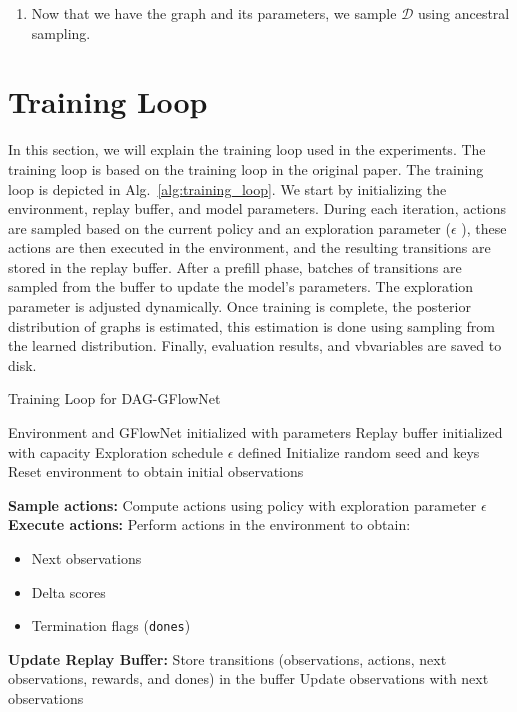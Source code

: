 \documentclass{lxaiproposal}
\begin{document}
\begin{table}[h]
\begin{enumerate}
            \item Now that we have the graph and its parameters, we sample $\mathcal{D}$ using ancestral sampling.
        \end{enumerate}


        \section{Training Loop}\label{app:training_loop}
        \vspace*{-3mm}

        In this section, we will explain the training loop used in the experiments. The training loop is based on the
        training loop in the original paper. The training loop is depicted in Alg.~\ref{alg:training_loop}.
        We start by initializing the environment, replay buffer, and model parameters.
        During each iteration, actions are sampled based on the current policy and an exploration parameter ($\epsilon$
        ), these actions are then executed in the environment, and the resulting transitions are stored in the replay
        buffer. After a prefill
        phase, batches of transitions are sampled from the buffer to update the model's parameters. The exploration
        parameter is adjusted dynamically. Once training is complete, the posterior distribution of graphs is estimated,
        this estimation is done using sampling from the learned distribution. Finally, evaluation results, and
        vbvariables are saved to disk.


        \begin{algorithm}[H]
            \caption{Training Loop for DAG-GFlowNet}
            \begin{algorithmic}[1]
                \Require Environment and GFlowNet initialized with parameters
                \Require Replay buffer initialized with capacity
                \Require Exploration schedule $\epsilon$ defined
                \State Initialize random seed and keys
                \State Reset environment to obtain initial observations

                    \State \textbf{Sample actions:} Compute actions using policy with exploration parameter $\epsilon$
                    \State \textbf{Execute actions:} Perform actions in the environment to obtain:
                    \begin{itemize}
                        \item Next observations
                        \item Delta scores
                        \item Termination flags (\texttt{dones})
                    \end{itemize}
                    \State \textbf{Update Replay Buffer:} Store transitions (observations, actions, next observations, rewards, and dones) in the buffer
                    \State Update observations with next observations


\end{algorithmic}
\end{algorithm}
\end{table}
\end{document}
